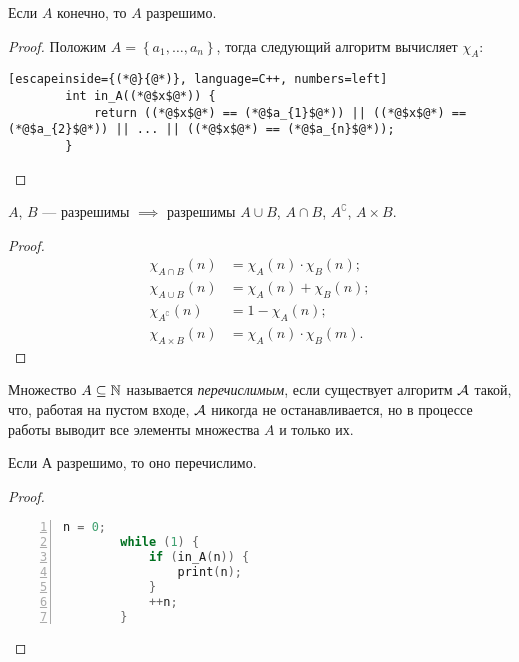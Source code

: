 \begin{statement}
    Если $A$ конечно, то $A$ разрешимо.
\end{statement}
\begin{proof}
    Положим $A = \left\{a_{1}, \ldots, a_{n}\right\}$, тогда следующий алгоритм вычисляет $\chi_{A}$:
    \begin{lstlisting}[escapeinside={(*@}{@*)}, language=C++, numbers=left]
        int in_A((*@$x$@*)) {
            return ((*@$x$@*) == (*@$a_{1}$@*)) || ((*@$x$@*) == (*@$a_{2}$@*)) || ... || ((*@$x$@*) == (*@$a_{n}$@*));
        }
    \end{lstlisting}
\end{proof}

\begin{statement}
    $A$, $B$ --- разрешимы $\implies$ разрешимы $A \cup B$, $A \cap B$, $A^{\complement}$, $A \times B$.
\end{statement}
\begin{proof}$ $
    \begin{align}
        \chi_{A \cap B}(n) &= \chi_{A}\left(n\right) \cdot \chi_{B}\left(n\right); \\
        \chi_{A \cup B}(n) &= \chi_{A}\left(n\right) + \chi_{B}\left(n\right); \\
        \chi_{A^{\complement}}(n) &= 1 - \chi_{A}\left(n\right); \\
        \chi_{A \times B}(n) &= \chi_{A}\left(n\right) \cdot \chi_{B}\left(m\right).
    \end{align}
\end{proof}

\begin{definition}
    Множество $A \subseteq \N$ называется {\it перечислимым}, если существует алгоритм $\AA$ такой, что, работая на пустом входе, $\AA$ никогда не останавливается, но в процессе работы выводит все элементы множества $A$ и только их.
\end{definition}

\begin{statement}
    Если А разрешимо, то оно перечислимо.
\end{statement}
\begin{proof}$ $
    \begin{lstlisting}[frame=single, language=C++, numbers=left]
        n = 0;
        while (1) {
            if (in_A(n)) {
                print(n);
            }
            ++n;
        }
    \end{lstlisting}
\end{proof}

